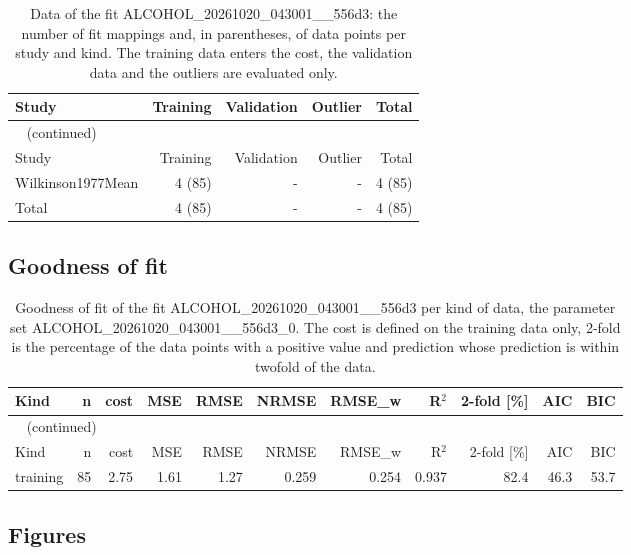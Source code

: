 \documentclass{article}
\begin{document}
\begin{longtable}{lrrrr}
\caption{Data of the fit ALCOHOL\_20261020\_043001\_\_556d3: the number of fit mappings and, in parentheses, of data points per study and kind. The training data enters the cost, the validation data and the outliers are evaluated only.}\label{tab:data:ALCOHOL_20261020_043001__556d3} \\
\toprule
Study & Training & Validation & Outlier & Total \\
\midrule
\endfirsthead
\multicolumn{5}{l}{\small\tablename~\thetable{} (continued)} \\
\toprule
Study & Training & Validation & Outlier & Total \\
\midrule
\endhead
\bottomrule
\endlastfoot
Wilkinson1977Mean & 4 (85) & - & - & 4 (85) \\
Total & 4 (85) & - & - & 4 (85) \\
\end{longtable}

\subsection{Goodness of fit}

\begin{longtable}{lrrrrrrrrrr}
\caption{Goodness of fit of the fit ALCOHOL\_20261020\_043001\_\_556d3 per kind of data, the parameter set ALCOHOL\_20261020\_043001\_\_556d3\_0. The cost is defined on the training data only, 2-fold is the percentage of the data points with a positive value and prediction whose prediction is within twofold of the data.}\label{tab:metrics:ALCOHOL_20261020_043001__556d3} \\
\toprule
Kind & n & cost & MSE & RMSE & NRMSE & RMSE\_w & R\ensuremath{^{2}} & 2-fold [\%] & AIC & BIC \\
\midrule
\endfirsthead
\multicolumn{11}{l}{\small\tablename~\thetable{} (continued)} \\
\toprule
Kind & n & cost & MSE & RMSE & NRMSE & RMSE\_w & R\ensuremath{^{2}} & 2-fold [\%] & AIC & BIC \\
\midrule
\endhead
\bottomrule
\endlastfoot
training & 85 & 2.75 & 1.61 & 1.27 & 0.259 & 0.254 & 0.937 & 82.4 & 46.3 & 53.7 \\
\end{longtable}

\subsection{Figures}
\end{document}
